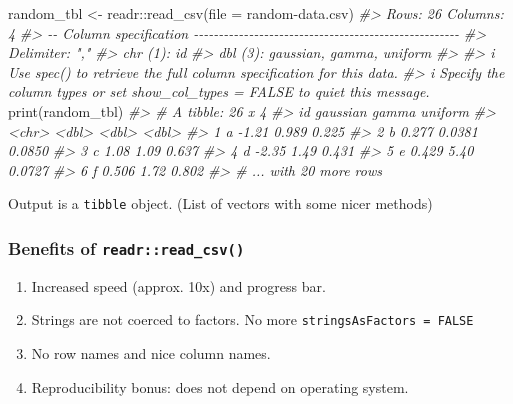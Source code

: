 \documentclass[
  12pt,
]{book}
\newenvironment{Shaded}{\begin{snugshade}}{\end{snugshade}}
\newcommand{\AttributeTok}[1]{\textcolor[rgb]{0.77,0.63,0.00}{#1}}
\newcommand{\CommentTok}[1]{\textcolor[rgb]{0.56,0.35,0.01}{\textit{#1}}}
\newcommand{\FunctionTok}[1]{\textcolor[rgb]{0.00,0.00,0.00}{#1}}
\newcommand{\NormalTok}[1]{#1}
\newcommand{\OtherTok}[1]{\textcolor[rgb]{0.56,0.35,0.01}{#1}}
\newcommand{\SpecialCharTok}[1]{\textcolor[rgb]{0.00,0.00,0.00}{#1}}
\newcommand{\StringTok}[1]{\textcolor[rgb]{0.31,0.60,0.02}{#1}}
\begin{document}
\begin{Shaded}
\begin{Highlighting}[]
\NormalTok{random\_tbl }\OtherTok{\textless{}{-}}\NormalTok{ readr}\SpecialCharTok{::}\FunctionTok{read\_csv}\NormalTok{(}\AttributeTok{file =} \StringTok{\textquotesingle{}random{-}data.csv\textquotesingle{}}\NormalTok{)}
\CommentTok{\#\textgreater{} Rows: 26 Columns: 4}
\CommentTok{\#\textgreater{} {-}{-} Column specification {-}{-}{-}{-}{-}{-}{-}{-}{-}{-}{-}{-}{-}{-}{-}{-}{-}{-}{-}{-}{-}{-}{-}{-}{-}{-}{-}{-}{-}{-}{-}{-}{-}{-}{-}{-}{-}{-}{-}{-}{-}{-}{-}{-}{-}{-}{-}{-}{-}{-}{-}{-}{-}}
\CommentTok{\#\textgreater{} Delimiter: ","}
\CommentTok{\#\textgreater{} chr (1): id}
\CommentTok{\#\textgreater{} dbl (3): gaussian, gamma, uniform}
\CommentTok{\#\textgreater{} }
\CommentTok{\#\textgreater{} i Use \textasciigrave{}spec()\textasciigrave{} to retrieve the full column specification for this data.}
\CommentTok{\#\textgreater{} i Specify the column types or set \textasciigrave{}show\_col\_types = FALSE\textasciigrave{} to quiet this message.}
\FunctionTok{print}\NormalTok{(random\_tbl)}
\CommentTok{\#\textgreater{} \# A tibble: 26 x 4}
\CommentTok{\#\textgreater{}   id    gaussian  gamma uniform}
\CommentTok{\#\textgreater{}   \textless{}chr\textgreater{}    \textless{}dbl\textgreater{}  \textless{}dbl\textgreater{}   \textless{}dbl\textgreater{}}
\CommentTok{\#\textgreater{} 1 a       {-}1.21  0.989   0.225 }
\CommentTok{\#\textgreater{} 2 b        0.277 0.0381  0.0850}
\CommentTok{\#\textgreater{} 3 c        1.08  1.09    0.637 }
\CommentTok{\#\textgreater{} 4 d       {-}2.35  1.49    0.431 }
\CommentTok{\#\textgreater{} 5 e        0.429 5.40    0.0727}
\CommentTok{\#\textgreater{} 6 f        0.506 1.72    0.802 }
\CommentTok{\#\textgreater{} \# ... with 20 more rows}
\end{Highlighting}
\end{Shaded}

Output is a \texttt{tibble} object. (List of vectors with some nicer methods)

\hypertarget{benefits-of-readrread_csv}{%
\subsubsection{\texorpdfstring{Benefits of \texttt{readr::read\_csv()}}{Benefits of readr::read\_csv()}}\label{benefits-of-readrread_csv}}

\begin{enumerate}
\def\labelenumi{\arabic{enumi}.}
\item
  Increased speed (approx. 10x) and progress bar.
\item
  Strings are not coerced to factors. No more \texttt{stringsAsFactors\ =\ FALSE}
\item
  No row names and nice column names.
\item
  Reproducibility bonus: does not depend on operating system.
\end{enumerate}
\end{document}
